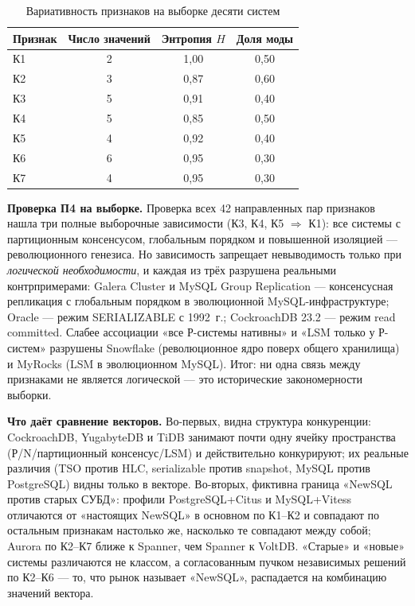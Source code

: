 \documentclass{misisarticle}
\begin{document}
\begin{table}[t]
\caption{Вариативность признаков на выборке десяти систем}\label{tab:p2}
\centering
\small
\begin{tabular}{lccc}
\toprule
\textbf{Признак} & \textbf{Число значений} & \textbf{Энтропия $H$} & \textbf{Доля моды} \\
\midrule
К1 & 2 & 1,00 & 0,50 \\
К2 & 3 & 0,87 & 0,60 \\
К3 & 5 & 0,91 & 0,40 \\
К4 & 5 & 0,85 & 0,50 \\
К5 & 4 & 0,92 & 0,40 \\
К6 & 6 & 0,95 & 0,30 \\
К7 & 4 & 0,95 & 0,30 \\
\bottomrule
\end{tabular}
\end{table}

\textbf{Проверка П4 на выборке.} Проверка всех 42 направленных пар признаков нашла три полные выборочные зависимости (К3, К4, К5 $\Rightarrow$ К1): все системы с партиционным консенсусом, глобальным порядком и повышенной изоляцией --- революционного генезиса. Но зависимость запрещает невыводимость только при \emph{логической необходимости}, и каждая из трёх разрушена реальными контрпримерами: Galera Cluster и MySQL Group Replication --- консенсусная репликация с глобальным порядком в эволюционной MySQL-инфраструктуре; Oracle --- режим SERIALIZABLE с 1992~г.; CockroachDB 23.2 --- режим read committed. Слабее ассоциации «все Р-системы нативны» и «LSM только у Р-систем» разрушены Snowflake (революционное ядро поверх общего хранилища) и MyRocks (LSM в эволюционном MySQL). Итог: ни одна связь между признаками не является логической --- это исторические закономерности выборки.

\textbf{Что даёт сравнение векторов.} Во-первых, видна структура конкуренции: CockroachDB, YugabyteDB и TiDB занимают почти одну ячейку пространства (Р/N/партиционный консенсус/LSM) и действительно конкурируют; их реальные различия (TSO против HLC, serializable против snapshot, MySQL против PostgreSQL) видны только в векторе. Во-вторых, фиктивна граница «NewSQL против старых СУБД»: профили PostgreSQL+Citus и MySQL+Vitess отличаются от «настоящих NewSQL» в основном по К1--К2 и совпадают по остальным признакам настолько же, насколько те совпадают между собой; Aurora по К2--К7 ближе к Spanner, чем Spanner к VoltDB. «Старые» и «новые» системы различаются не классом, а согласованным пучком независимых решений по К2--К6 --- то, что рынок называет «NewSQL», распадается на комбинацию значений вектора.
\end{document}
